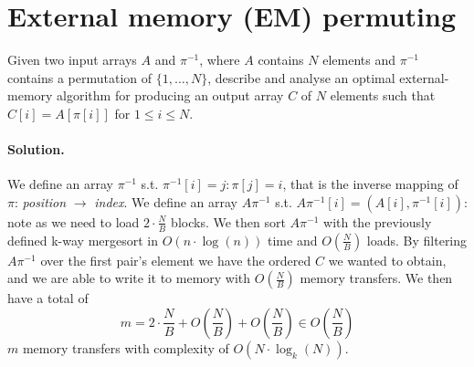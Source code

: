 \section{External memory (EM) permuting}
Given two input arrays $A$ and $\pi^{-1}$, where $A$ contains $N$ elements and $\pi^{-1}$ contains a permutation of $\{1, \dots, N\}$, describe and analyse an optimal external-memory algorithm for producing an output array $C$ of $N$ elements such that $C[i] = A[\pi[i]]$ for $1 \leq i \leq N$.

\vspace{0.5cm} \paragraph{Solution.}
We define an array $\pi^{-1}$ s.t. $\pi^{-1}[i] = j : \pi[j] = i$, that is the inverse mapping of $\pi$: \emph{position} $\to$ \emph{index}.
We define an array $A\pi^{-1}$ s.t. $A\pi^{-1}[i] = (A[i], \pi^{-1}[i])$: note as we need to load $2 \cdot \frac{N}{B}$ blocks.
We then sort $A\pi^{-1}$ with the previously defined k-way mergesort in $O(n \cdot \log(n))$ time and $O(\frac{N}{B})$ loads.
By filtering $A\pi^{-1}$ over the first pair's element we have the ordered $C$ we wanted to obtain, and we are able to write it to memory with $O(\frac{N}{B})$ memory transfers.
We then have a total of
\begin{equation*}
m = 2 \cdot \frac{N}{B} + O(\frac{N}{B}) + O(\frac{N}{B}) \in O(\frac{N}{B})
\end{equation*}
$m$ memory transfers with complexity of $O(N \cdot \log_k(N))$.
